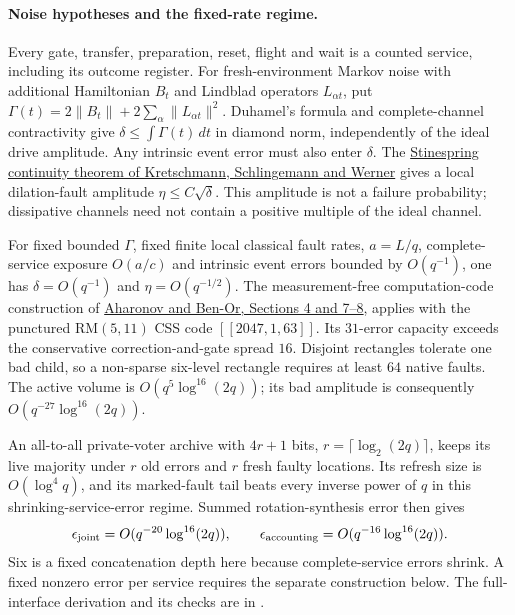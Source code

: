 \paragraph{Noise hypotheses and the fixed-rate regime.}
Every gate, transfer, preparation, reset, flight and wait is a counted
service, including its outcome register. For fresh-environment Markov
noise with additional Hamiltonian $B_t$ and Lindblad operators $L_{\alpha t}$,
put $\Gamma(t)=2\|B_t\|+2\sum_\alpha\|L_{\alpha t}\|^2$.
Duhamel's formula and complete-channel contractivity give
$\delta\le\int\Gamma(t)\,dt$ in diamond norm, independently of the
ideal drive amplitude. Any intrinsic event error must also enter $\delta$.
The
\href{https://arxiv.org/abs/quant-ph/0605009}{Stinespring continuity theorem
of Kretschmann, Schlingemann and Werner}
gives a local dilation-fault amplitude $\eta\le C\sqrt\delta$.
This amplitude is not a failure probability; dissipative channels need not
contain a positive multiple of the ideal channel.

For fixed bounded $\Gamma$, fixed finite local classical fault rates,
$a=L/q$, complete-service exposure $O(a/c)$ and intrinsic event errors
bounded by $O(q^{-1})$, one has
$\delta=O(q^{-1})$ and $\eta=O(q^{-1/2})$.
The measurement-free computation-code construction of
\href{https://arxiv.org/abs/quant-ph/9906129}{Aharonov and Ben-Or,
Sections 4 and 7--8}, applies with the punctured RM$(5,11)$ CSS code
$[[2047,1,63]]$. Its $31$-error capacity exceeds the conservative
correction-and-gate spread $16$. Disjoint rectangles tolerate one bad
child, so a non-sparse six-level rectangle requires at least $64$ native
faults. The active volume is $O(q^5\log^{16}(2q))$; its bad amplitude
is consequently $O(q^{-27}\log^{16}(2q))$.

An all-to-all private-voter archive with $4r+1$ bits, $r=\lceil\log_2(2q)\rceil$,
keeps its live majority under $r$ old errors and $r$ fresh faulty locations.
Its refresh size is $O(\log^4 q)$, and its marked-fault tail beats every
inverse power of $q$ in this shrinking-service-error regime. Summed
rotation-synthesis error then gives
\[
 \epsilon_{\rm joint}=O(q^{-20}\log^{16}(2q)),\qquad
 \epsilon_{\rm accounting}=O(q^{-16}\log^{16}(2q)).
\]
Six is a fixed concatenation depth here because complete-service errors
shrink. A fixed nonzero error per service requires the separate construction
below. The full-interface derivation and its checks are in
.

